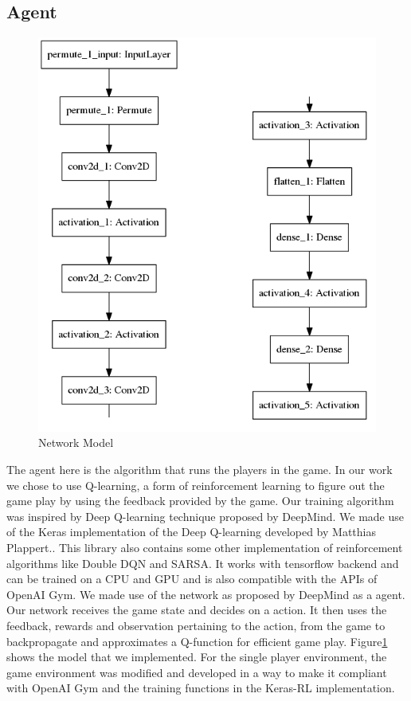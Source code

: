 \documentclass[conference,10pt]{IEEEtran}
\begin{document}
	\subsection{Agent}
		\begin{figure}[]
			
			\includegraphics[scale=0.5]{model.png}
			\caption{Network Model}
			\label{model}
			
		\end{figure}
	The agent here is the algorithm that runs the players in the game. In our work we chose to use Q-learning, a form of reinforcement learning to figure out the game play by using the feedback provided by the game. Our training algorithm was inspired by Deep Q-learning technique proposed by DeepMind\cite{n4}.
	\break
	\break
	We made use of the Keras implementation of the Deep Q-learning developed by Matthias Plappert.\cite{n5}. This library also contains some other implementation of reinforcement algorithms like Double DQN and SARSA. It works with tensorflow backend and can be trained on a CPU and GPU and is also compatible with the APIs of OpenAI Gym.
	\break
	\break
	We made use of the network as proposed by DeepMind as a agent. Our network receives the game state and decides on a action. It then uses the feedback, rewards and observation pertaining to the action, from the game to backpropagate and approximates a Q-function for efficient game play.
	Figure\ref{model} shows the model that we implemented.
	\break
	\break
	For the single player environment, the game environment was modified and developed in a way to make it compliant with OpenAI Gym and the training functions in the Keras-RL implementation.
	\break
	\break 
	
\end{document}
